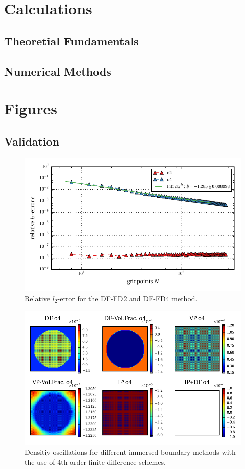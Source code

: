 \chapter{Calculations}

\section{Theoretial Fundamentals}
\section{Numerical Methods}

\chapter{Figures}
\section{Validation}


\begin{figure}[!bp]
    \centering
    \includegraphics{gfx/immersed_boundary/poiseuille_flow/3_df/relative_l2error.pdf}
    \caption{Relative $l_2$-error for the DF-FD2 and DF-FD4 method.}
    \label{fig:vali_pflow_3gc}
\end{figure}

\begin{figure}[!h]
  \centering
  \includegraphics{gfx/immersed_boundary/hpflow/long/rho.pdf}
  \caption{Densitiy oscillations for different immersed boundary methods with the use  of 4th order finite difference schemes.}
    \label{fig:hpflow_allgc_theo}
\end{figure}

